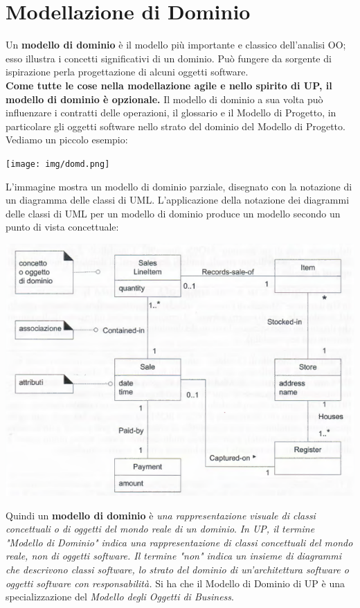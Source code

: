 \documentclass[a4paper,12pt, oneside]{book}
\begin{document}
\chapter{Modellazione di Dominio}
Un \textbf{modello di dominio} è il modello più importante e classico dell'analisi OO; esso illustra i concetti significativi di un dominio. Può fungere da sorgente di ispirazione perla progettazione di alcuni oggetti software.\\
\textbf{Come tutte le cose nella modellazione agile e nello spirito di UP, il modello di dominio è opzionale.}
Il modello di dominio a sua volta può influenzare i contratti delle operazioni, il glossario e il Modello di Progetto, in particolare gli oggetti software nello strato del dominio del Modello di Progetto.\\
Vediamo un piccolo esempio:
\begin{center}
	\texttt{[image: img/domd.png]}
\end{center}
L'immagine mostra un modello di dominio parziale, disegnato con la notazione di un diagramma delle classi di UML. L'applicazione della notazione dei diagrammi delle classi di UML per un modello di dominio produce un modello secondo un punto di vista concettuale:
\begin{center}
	\includegraphics[scale=0.6]{img/domd2.png}
\end{center}
Quindi un \textbf{modello di dominio} è \textit{una rappresentazione visuale di classi concettuali o di oggetti del mondo reale di un dominio}. \textit{In UP, il termine "Modello di Dominio" indica una rappresentazione di classi concettuali del mondo reale, non di oggetti software. Il termine "non" indica un insieme di diagrammi che descrivono classi software, lo strato del dominio di un'architettura software o oggetti software con responsabilità.} Si ha che il Modello di Dominio di UP è una specializzazione del \textit{Modello degli Oggetti di Business}.\\
\end{document}
